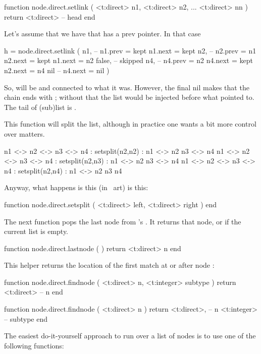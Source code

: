 \starttyping[option=LUA]
function node.direct.setlink (
    <t:direct> n1,
    <t:direct> n2,
    ...
    <t:direct> nn
)
    return <t:direct> -- head
end
\stoptyping

Let's assume that we have  that has a prev pointer. In that case

\starttyping[option=LUA]
h = node.direct.setlink (
    n1,    -- n1.prev = kept  n1.next = kept
    n2,    -- n2.prev = n1    n2.next = kept  n1.next = n2
    false, -- skipped
    n4,    -- n4.prev = n2    n4.next = kept  n2.next = n4
    nil    --                                 n4.next = nil
)
\stoptyping

So,  will be  and connected to what it was. However, the final
nil makes that the chain ends with ; without that the list would be
injected before what  pointed to. The tail of (sub)list  is
.

This function will split the list, although in practice one wants a bit more
control over matters.

\starttyping
n1 <-> n2 <-> n3 <-> n4 : setsplit(n2,n2) : n1 <-> n2      n3 <-> n4
n1 <-> n2 <-> n3 <-> n4 : setsplit(n2,n3) : n1 <-> n2      n3 <-> n4
n1 <-> n2 <-> n3 <-> n4 : setsplit(n2,n4) : n1 <-> n2  n3  n4
\stoptyping

Anyway, what happens is this (in \ASCII\ art) is this:

\starttyping[option=LUA]
function node.direct.setsplit ( <t:direct> left, <t:direct> right ) end
\stoptyping

The next function pops the last node from \TEX's . It returns
that node, or  if the current list is empty.

\starttyping[option=LUA]
function node.direct.lastnode ( )
    return <t:direct> n
end
\stoptyping

This helper returns the location of the first match at or after node :

\starttyping[option=LUA]
function node.direct.findnode ( <t:direct> n, <t:integer> subtype )
    return <t:direct> -- n
end

function node.direct.findnode ( <t:direct> n )
    return
        <t:direct>, -- n
        <t:integer> -- subtype
end
\stoptyping

\stopsubsection

\startsubsection[title={Traversing}]

The easiest do-it-yourself approach to run over a list of nodes is to use one of
the following functions:

